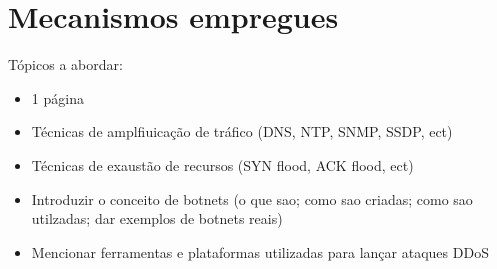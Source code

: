 \section{Mecanismos empregues}
Tópicos a abordar:
\begin{itemize}
    \item 1 página
    \item Técnicas de amplfiuicação de tráfico (DNS, NTP, SNMP, SSDP, ect)
    \item Técnicas de exaustão de recursos (SYN flood, ACK flood, ect)
    \item Introduzir o conceito de botnets (o que sao; como sao criadas; como sao utilzadas; dar exemplos de botnets reais)
    \item Mencionar ferramentas e plataformas utilizadas para lançar ataques DDoS
\end{itemize}